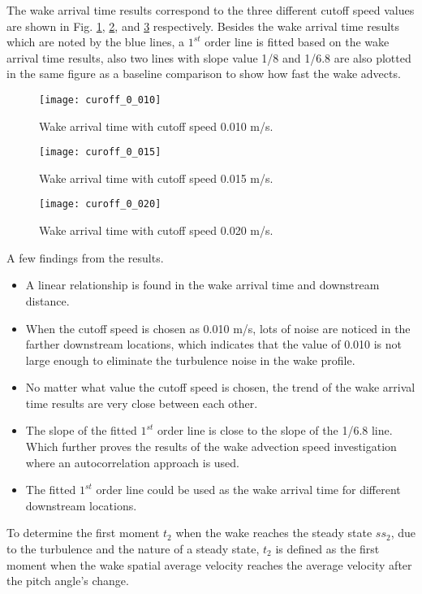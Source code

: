 \documentclass{umthesis}
\begin{document}
The wake arrival time results correspond to the three different cutoff speed values are shown in Fig. \ref{fig:curoff_0_010}, \ref{fig:curoff_0_015}, and \ref{fig:curoff_0_020} respectively. Besides the wake arrival time results which are noted by the blue lines, a $1^{st}$ order line is fitted based on the wake arrival time results, also two lines with slope value 1/8 and 1/6.8 are also plotted in the same figure as a baseline comparison to show how fast the wake advects.

\begin{figure}
  \centering
  \texttt{[image: curoff\_0\_010]}
  \caption{Wake arrival time with cutoff speed 0.010 m/s.}\label{fig:curoff_0_010}
\end{figure}

\begin{figure}
  \centering
  \texttt{[image: curoff\_0\_015]}
  \caption{Wake arrival time with cutoff speed 0.015 m/s.}\label{fig:curoff_0_015}
\end{figure}

\begin{figure}
  \centering
  \texttt{[image: curoff\_0\_020]}
  \caption{Wake arrival time with cutoff speed 0.020 m/s.}\label{fig:curoff_0_020}
\end{figure}

A few findings from the results.
\begin{itemize}
  \item A linear relationship is found in the wake arrival time and downstream distance.
  \item When the cutoff speed is chosen as 0.010 m/s, lots of noise are noticed in the farther downstream locations, which indicates that the value of 0.010 is not large enough to eliminate the turbulence noise in the wake profile.
  \item No matter what value the cutoff speed is chosen, the trend of the wake arrival time results are very close between each other.
  \item The slope of the fitted $1^{st}$ order line is close to the slope of the 1/6.8 line. Which further proves the results of the wake advection speed investigation where an autocorrelation approach is used.
  \item The fitted $1^{st}$ order line could be used as the wake arrival time for different downstream locations.
\end{itemize}


To determine the first moment $t_2$ when the wake reaches the steady state $ss_2$, due to the turbulence and the nature of a steady state, $t_2$ is defined as the first moment when the wake spatial average velocity reaches the average velocity after the pitch angle’s change.
\end{document}
